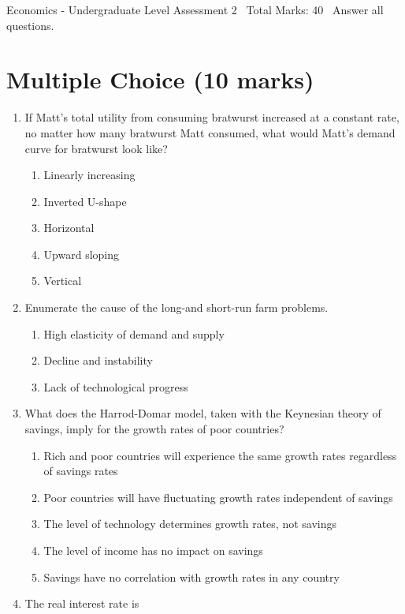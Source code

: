 \documentclass[12pt]{article}
\begin{document}
\begin{center}
Economics - Undergraduate Level Assessment 2 \
Total Marks: 40 \
Answer all questions.
\end{center}

\section*{Multiple Choice (10 marks)}
\begin{enumerate}[label=\arabic*.]
\item If Matt's total utility from consuming bratwurst increased at a constant rate, no matter how many bratwurst Matt consumed, what would Matt's demand curve for bratwurst look like?
\begin{enumerate}[label=(\alph*)]
    \item Linearly increasing
    \item Inverted U-shape
    \item Horizontal
    \item Upward sloping
    \item Vertical
\end{enumerate}
\item Enumerate the cause of the long-and short-run farm problems.
\begin{enumerate}[label=(\alph*)]
    \item High elasticity of demand and supply
    \item Decline and instability
    \item Lack of technological progress
\end{enumerate}
\item What does the Harrod-Domar model, taken with the Keynesian theory of savings, imply for the growth rates of poor countries?
\begin{enumerate}[label=(\alph*)]
    \item Rich and poor countries will experience the same growth rates regardless of savings rates
    \item Poor countries will have fluctuating growth rates independent of savings
    \item The level of technology determines growth rates, not savings
    \item The level of income has no impact on savings
    \item Savings have no correlation with growth rates in any country
\end{enumerate}
\item The real interest rate is

\end{enumerate}
\end{document}
